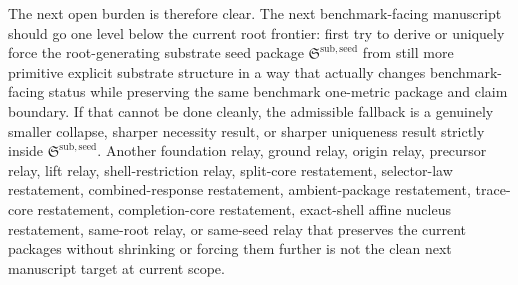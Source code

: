 \documentclass[11pt]{article}
\newcommand{\SeedPackage}{\mathfrak S^{\mathrm{sub,seed}}}
\begin{document}
The next open burden is therefore clear. The next benchmark-facing manuscript should go one level below the current root frontier: first try to derive or uniquely force the root-generating substrate seed package \(\SeedPackage\) from still more primitive explicit substrate structure in a way that actually changes benchmark-facing status while preserving the same benchmark one-metric package and claim boundary. If that cannot be done cleanly, the admissible fallback is a genuinely smaller collapse, sharper necessity result, or sharper uniqueness result strictly inside \(\SeedPackage\). Another foundation relay, ground relay, origin relay, precursor relay, lift relay, shell-restriction relay, split-core restatement, selector-law restatement, combined-response restatement, ambient-package restatement, trace-core restatement, completion-core restatement, exact-shell affine nucleus restatement, same-root relay, or same-seed relay that preserves the current packages without shrinking or forcing them further is not the clean next manuscript target at current scope.
\end{document}
